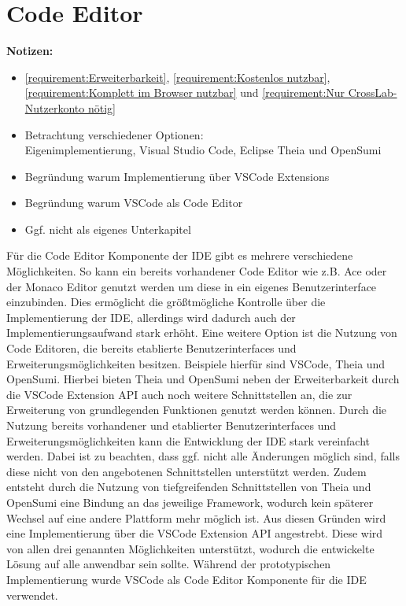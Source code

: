 \section{Code Editor}\label{section:prototypische-implementierung:code-editor}

\begin{note}
    \textbf{Notizen:}
    \begin{itemize}
        \item \autoref{requirement:Erweiterbarkeit}, \autoref{requirement:Kostenlos nutzbar}, \autoref{requirement:Komplett im Browser nutzbar} und \autoref{requirement:Nur CrossLab-Nutzerkonto nötig}
        \item Betrachtung verschiedener Optionen: \\ Eigenimplementierung, Visual Studio Code, Eclipse Theia und OpenSumi
        \item Begründung warum Implementierung über VSCode Extensions
        \item Begründung warum VSCode als Code Editor
        \item Ggf. nicht als eigenes Unterkapitel
    \end{itemize}
\end{note}

Für die Code Editor Komponente der IDE gibt es mehrere verschiedene Möglichkeiten. So kann ein bereits vorhandener Code Editor wie z.B. Ace oder der Monaco Editor genutzt werden um diese in ein eigenes Benutzerinterface einzubinden. Dies ermöglicht die größtmögliche Kontrolle über die Implementierung der IDE, allerdings wird dadurch auch der Implementierungsaufwand stark erhöht. Eine weitere Option ist die Nutzung von Code Editoren, die bereits etablierte Benutzerinterfaces und Erweiterungsmöglichkeiten besitzen. Beispiele hierfür sind VSCode, Theia und OpenSumi. Hierbei bieten Theia und OpenSumi neben der Erweiterbarkeit durch die VSCode Extension API auch noch weitere Schnittstellen an, die zur Erweiterung von grundlegenden Funktionen genutzt werden können. Durch die Nutzung bereits vorhandener und etablierter Benutzerinterfaces und Erweiterungsmöglichkeiten kann die Entwicklung der IDE stark vereinfacht werden. Dabei ist zu beachten, dass ggf. nicht alle Änderungen möglich sind, falls diese nicht von den angebotenen Schnittstellen unterstützt werden. Zudem entsteht durch die Nutzung von tiefgreifenden Schnittstellen von Theia und OpenSumi eine Bindung an das jeweilige Framework, wodurch kein späterer Wechsel auf eine andere Plattform mehr möglich ist. Aus diesen Gründen wird eine Implementierung über die VSCode Extension API angestrebt. Diese wird von allen drei genannten Möglichkeiten unterstützt, wodurch die entwickelte Lösung auf alle anwendbar sein sollte. Während der prototypischen Implementierung wurde VSCode als Code Editor Komponente für die IDE verwendet.